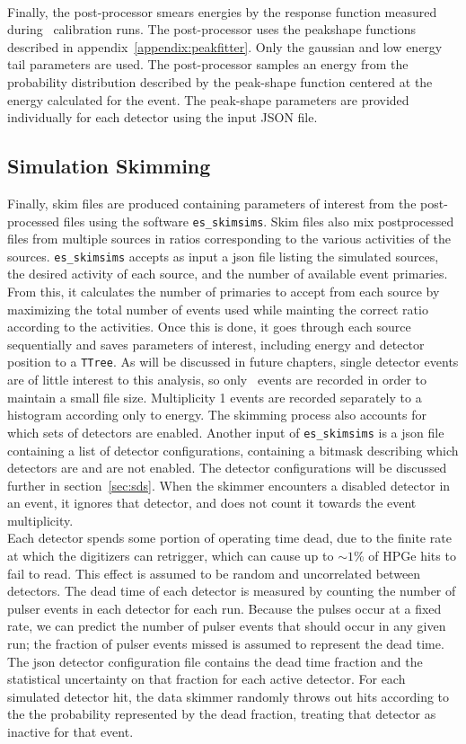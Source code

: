 \documentclass[/main.tex]{subfiles}
\begin{document}
\\
Finally, the post-processor smears energies by the response function measured during \ calibration runs.
The post-processor uses the peakshape functions described in appendix~\ref{appendix:peakfitter}.
Only the gaussian and low energy tail parameters are used.
The post-processor samples an energy from the probability distribution described by the peak-shape function centered at the energy calculated for the event.
The peak-shape parameters are provided individually for each detector using the input JSON file.

\subsection{Simulation Skimming} \label{sec:simskim}
Finally, skim files are produced containing parameters of interest from the post-processed files using the software \texttt{es\_skimsims}.
Skim files also mix postprocessed files from multiple sources in ratios corresponding to the various activities of the sources.
\texttt{es\_skimsims} accepts as input a json file listing the simulated sources, the desired activity of each source, and the number of available event primaries.
From this, it calculates the number of primaries to accept from each source by maximizing the total number of events used while mainting the correct ratio according to the activities.
Once this is done, it goes through each source sequentially and saves parameters of interest, including energy and detector position to a \texttt{TTree}.
As will be discussed in future chapters, single detector events are of little interest to this analysis, so only \msmd\ events are recorded in order to maintain a small file size.
Multiplicity 1 events are recorded separately to a histogram according only to energy.
The skimming process also accounts for which sets of detectors are enabled.
Another input of \texttt{es\_skimsims} is a json file containing a list of detector configurations, containing a bitmask describing which detectors are and are not enabled.
The detector configurations will be discussed further in section~\ref{sec:sds}.
When the skimmer encounters a disabled detector in an event, it ignores that detector, and does not count it towards the event multiplicity.
\\
 
Each detector spends some portion of operating time dead, due to the finite rate at which the digitizers can retrigger, which can cause up to $\sim1$\% of HPGe hits to fail to read.
This effect is assumed to be random and uncorrelated between detectors.
The dead time of each detector is measured by counting the number of pulser events in each detector for each run.
Because the pulses occur at a fixed rate, we can predict the number of pulser events that should occur in any given run; the fraction of pulser events missed is assumed to represent the dead time.
The json detector configuration file contains the dead time fraction and the statistical uncertainty on that fraction for each active detector.
For each simulated detector hit, the data skimmer randomly throws out hits according to the the probability represented by the dead fraction, treating that detector as inactive for that event.
\end{document}
